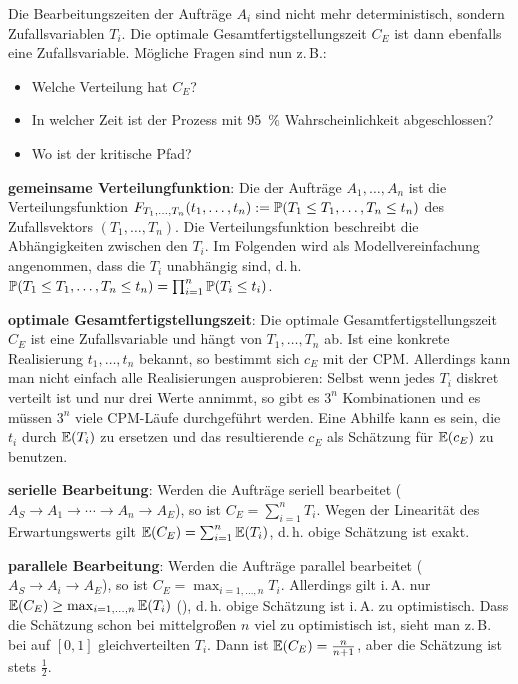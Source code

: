 Die Bearbeitungszeiten der Aufträge $A_i$ sind nicht mehr deterministisch, sondern
Zufallsvariablen $T_i$.
Die optimale Gesamtfertigstellungszeit $C_E$ ist dann ebenfalls eine Zufallsvariable.
Mögliche Fragen sind nun z.\,B.:
\begin{itemize}
    \item
    Welche Verteilung hat $C_E$?
    
    \item
    In welcher Zeit ist der Prozess mit \SI{95}{\percent} Wahrscheinlichkeit abgeschlossen?
    
    \item
    Wo ist der kritische Pfad?
\end{itemize}

\linie

\textbf{gemeinsame Verteilungfunktion}:
Die  der Aufträge $A_1, \dotsc, A_n$ ist
die Verteilungsfunktion
$F_{T_1,\dotsc,T_n}(t_1, \dotsc, t_n) := \mathbb{P}(T_1 \le T_1, \dotsc, T_n \le t_n)$
des Zufallsvektors $(T_1, \dotsc, T_n)$.
Die Verteilungsfunktion beschreibt die Abhängigkeiten zwischen den $T_i$.
Im Folgenden wird als Modellvereinfachung angenommen, dass die $T_i$ unabhängig sind, d.\,h.\\
$\mathbb{P}(T_1 \le T_1, \dotsc, T_n \le t_n) = \prod_{i=1}^n \mathbb{P}(T_i \le t_i)$.

\textbf{optimale Gesamtfertigstellungszeit}:
Die optimale Gesamtfertigstellungszeit $C_E$ ist eine Zufallsvariable und hängt von
$T_1, \dotsc, T_n$ ab.
Ist eine konkrete Realisierung $t_1, \dotsc, t_n$ bekannt, so bestimmt sich $c_E$ mit der CPM.
Allerdings kann man nicht einfach alle Realisierungen ausprobieren:
Selbst wenn jedes $T_i$ diskret verteilt ist und nur drei Werte annimmt, so gibt es
$3^n$ Kombinationen und es müssen $3^n$ viele CPM-Läufe durchgeführt werden.
Eine Abhilfe kann es sein, die $t_i$ durch $\mathbb{E}(T_i)$ zu ersetzen
und das resultierende $c_E$ als Schätzung für $\mathbb{E}(c_E)$ zu benutzen.

\linie

\textbf{serielle Bearbeitung}:
Werden die Aufträge seriell bearbeitet ($A_S \to A_1 \to \dotsb \to A_n \to A_E$),
so ist $C_E = \sum_{i=1}^n T_i$.
Wegen der Linearität des Erwartungswerts gilt
$\mathbb{E}(C_E) = \sum_{i=1}^n \mathbb{E}(T_i)$, d.\,h. obige Schätzung ist exakt.

\textbf{parallele Bearbeitung}:
Werden die Aufträge parallel bearbeitet ($A_S \to A_i \to A_E$),
so ist $C_E = \max_{i=1,\dotsc,n} T_i$.
Allerdings gilt i.\,A. nur $\mathbb{E}(C_E) \ge \max_{i=1,\dotsc,n} \mathbb{E}(T_i)$
(),
d.\,h. obige Schätzung ist i.\,A. zu optimistisch.
Dass die Schätzung schon bei mittelgroßen $n$ viel zu optimistisch ist, sieht man
z.\,B. bei auf $[0, 1]$ gleichverteilten $T_i$.
Dann ist $\mathbb{E}(C_E) = \frac{n}{n+1}$, aber die Schätzung ist stets $\frac{1}{2}$.

